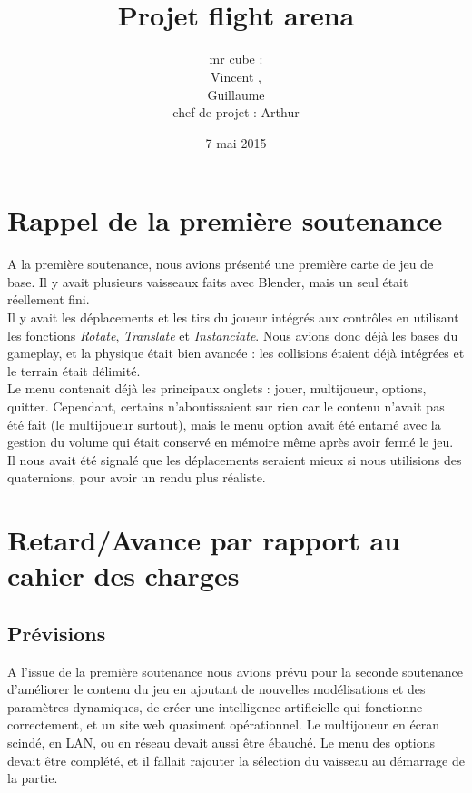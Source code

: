 \documentclass[10pt, titlepage]{report}
\title{\bsc{Rapport de la deuxième soutenance}\\Projet flight arena}
\author{mr cube :\\
Vincent \bsc{Rospini-Clerici},\\
Guillaume \bsc{Rebut}\\
chef de projet : Arthur \bsc{Remaud}}
\date{7 mai 2015}
\begin{document}
\maketitle
\renewcommand{\contentsname}{Sommaire}
\renewcommand{\chaptername}{Partie}

\tableofcontents

\chapter{Rappel de la première soutenance}

A la première soutenance, nous avions présenté une première carte de jeu de base. Il y avait plusieurs vaisseaux faits avec Blender, mais un seul était réellement fini.\\

 Il y avait les déplacements et les tirs du joueur intégrés aux contrôles en utilisant les fonctions \textit{Rotate}, \textit{Translate} et \textit{Instanciate}. Nous avions donc déjà les bases du gameplay, et la physique était bien avancée : les collisions étaient déjà intégrées et le terrain était délimité.\\

Le menu contenait déjà les principaux onglets : jouer, multijoueur, options, quitter. Cependant, certains n'aboutissaient sur rien car le contenu n'avait pas été fait (le multijoueur surtout), mais le menu option avait été entamé avec la gestion du volume qui était conservé en mémoire même après avoir fermé le jeu.\\

Il nous avait été signalé que les déplacements seraient mieux si nous utilisions des quaternions, pour avoir un rendu plus réaliste.\\

\chapter{Retard/Avance par rapport au cahier des charges}

\section{Prévisions}
A l'issue de la première soutenance nous avions prévu pour la seconde soutenance d'améliorer le contenu du jeu en ajoutant de nouvelles modélisations et des paramètres dynamiques, de créer une intelligence artificielle qui fonctionne correctement, et un site web quasiment opérationnel. Le multijoueur en écran scindé, en LAN, ou en réseau devait aussi être ébauché. Le menu des options devait être complété, et il fallait rajouter la sélection du vaisseau au démarrage de la partie.
\end{document}
